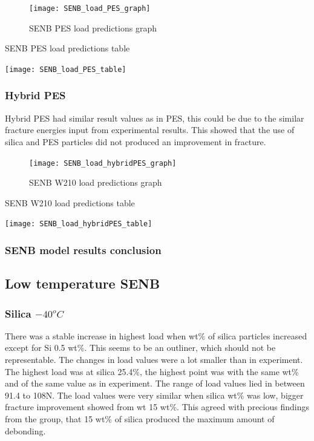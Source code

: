 \documentclass[numbers=noendperiod,chapterprefix=on]{icldt} %
\begin{document}
{\begin{figure}[!hp]
  \centering
  \texttt{[image: SENB\_load\_PES\_graph]}\label{SENB_load_PES_graph}
  \caption{SENB PES load predictions graph}
  \end{figure}
  \FloatBarrier
 
 \begin{table}
   \centering
   \caption{SENB PES load predictions table}\label{SENB_load_PES_table}
   \texttt{[image: SENB\_load\_PES\_table]}
   \end{table}
   \FloatBarrier

\subsubsection{Hybrid PES}
Hybrid PES had similar result values as in PES, this could be due to the similar fracture energies input from experimental results. This showed that the use of silica and PES particles did not produced an improvement in fracture. 

\begin{figure}[!hp]
  \centering
  \texttt{[image: SENB\_load\_hybridPES\_graph]}\label{SENB_load_hybridPES_graph}
  \caption{SENB W210 load predictions graph}
  \end{figure}
  \FloatBarrier
 
\begin{table}
   \centering
   \caption{SENB W210 load predictions table}\label{SENB_load_hybridPES_table}
   \texttt{[image: SENB\_load\_hybridPES\_table]}
   \end{table}
   \FloatBarrier
   
  \subsubsection{SENB model results conclusion}
   
 \subsection{Low temperature SENB} \label{FE_LT_SENB}
 
\subsubsection{Silica $ -40 ^{o}C$}
There was a stable increase in highest load when wt\% of silica particles increased except for Si 0.5 wt\%. This seems to be an outliner, which should not be representable.  The changes in load values were a lot smaller than in experiment. The highest load was at silica 25.4\%, the highest point was with the same wt\% and of the same value as in experiment. The range of load values lied in between 91.4 to 108N. The load values were very similar when silica wt\% was low, bigger fracture improvement showed from wt 15 wt\%. This agreed with precious findings from the group, that 15 wt\% of silica produced the maximum amount of debonding. 

}
\end{document}
